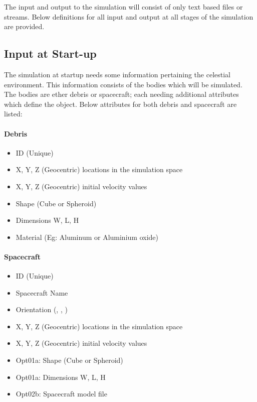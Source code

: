 \documentclass{article}
\begin{document}
The input and output to the simulation will consist of only text based files or streams. Below definitions for all input and output at all stages of the simulation are provided. 
  
  \subsection{Input at Start-up}
  
  The simulation at startup needs some information pertaining the celestial environment. This information consists of the bodies which will be simulated. The bodies are ether debris or spacecraft; each needing additional attributes which define the object. Below attributes for both debris and spacecraft are listed:
  
  \paragraph{Debris}
  \begin{itemize}
  	\item ID (Unique)
  	\item X, Y, Z (Geocentric) locations in the simulation space
  	\item X, Y, Z (Geocentric) initial velocity values
  	\item Shape (Cube or Spheroid)
  	\item Dimensions W, L, H
  	\item Material (Eg: Aluminum or Aluminium oxide)
  \end{itemize}
  
  \paragraph{Spacecraft}
  \begin{itemize}
    	\item ID (Unique)
    	\item Spacecraft Name
    	\item Orientation (\textalpha, \textbeta, \textgamma)
  	\item X, Y, Z (Geocentric) locations in the simulation space
  	\item X, Y, Z (Geocentric) initial velocity values
  	\item Opt01a: Shape (Cube or Spheroid)
  	\item Opt01a: Dimensions W, L, H
  	\item Opt02b: Spacecraft model file
  \end{itemize}
  
\end{document}
